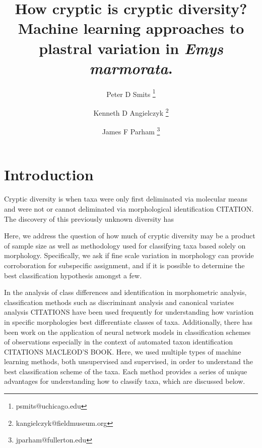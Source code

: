 \documentclass[12pt]{article}\usepackage{graphicx, color}
\title{How cryptic is cryptic diversity? Machine learning approaches to plastral variation in \textit{Emys marmorata}.}
\author[1]{Peter D Smits \thanks{psmits@uchicago.edu}}
\author[2]{Kenneth D Angielczyk \thanks{kangielczyk@fieldmuseum.org}}
\author[3]{James F Parham \thanks{jparham@fullerton.edu}}
\affil[1]{Committee on Evolution Biology, University of Chicago}
\affil[2]{Department of Geology, Field Museum of Natural History}
\affil[3]{Department of Geological Sciences, California State University -- Fullerton}
\begin{document}
\maketitle

\linenumbers
\modulolinenumbers[2]

\begin{abstract}

\end{abstract}

\section{Introduction}

Cryptic diversity is when taxa were only first deliminated via molecular means and were not or cannot deliminated via morphological identification CITATION. The discovery of this previously unknown diversity has
%

Here, we address the question of how much of cryptic diversity may be a product of sample size as well as methodology used for classifying taxa based solely on morphology. Specifically, we ask if fine scale variation in morphology can provide corroboration for subspecific assignment, and if it is possible to determine the best classification hypothesis amongst a few.

In the analysis of class differences and identification in morphometric analysis, classification methods such as discriminant analysis and canonical variates analysis CITATIONS have been used frequently for understanding how variation in specific morphologies best differentiate classes of taxa. Additionally, there has been work on the application of neural network models in classification schemes of observations especially in the context of automated taxon identification CITATIONS MACLEOD'S BOOK. Here, we used multiple types of machine learning methods, both unsupervised and supervised, in order to understand the best classification scheme of the taxa. Each method provides a series of unique advantages for understanding how to classify taxa, which are discussed below.
\end{document}
